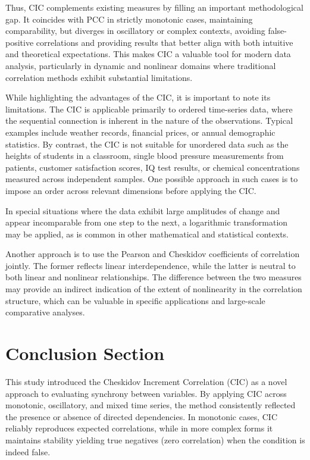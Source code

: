 \documentclass[aos]{imsart}
\newcommand{\cic}{\text{CIC}}
\newcommand{\pcc}{\text{PCC}}
\begin{document}
Thus, $\cic$ complements existing measures by filling an important methodological gap. It coincides with $\pcc$ in strictly monotonic cases, maintaining comparability, but diverges in oscillatory or complex contexts, avoiding false-positive correlations and providing results that better align with both intuitive and theoretical expectations. This makes $\cic$ a valuable tool for modern data analysis, particularly in dynamic and nonlinear domains where traditional correlation methods exhibit substantial limitations.

While highlighting the advantages of the $\cic$, it is important to note its limitations. The $\cic$ is applicable primarily to ordered time-series data, where the sequential connection is inherent in the nature of the observations. Typical examples include weather records, financial prices, or annual demographic statistics. By contrast, the $\cic$ is not suitable for unordered data such as the heights of students in a classroom, single blood pressure measurements from patients, customer satisfaction scores, IQ test results, or chemical concentrations measured across independent samples. One possible approach in such cases is to impose an order across relevant dimensions before applying the $\cic$.

In special situations where the data exhibit large amplitudes of change and appear incomparable from one step to the next, a logarithmic transformation may be applied, as is common in other mathematical and statistical contexts.

Another approach is to use the Pearson and Cheskidov coefficients of correlation jointly. The former reflects linear interdependence, while the latter is neutral to both linear and nonlinear relationships. The difference between the two measures may provide an indirect indication of the extent of nonlinearity in the correlation structure, which can be valuable in specific applications and large-scale comparative analyses.

\section{Conclusion Section}

This study introduced the Cheskidov Increment Correlation ($\cic$) as a novel approach to evaluating synchrony between variables. By applying $\cic$ across monotonic, oscillatory, and mixed time series, the method consistently reflected the presence or absence of directed dependencies. In monotonic cases, $\cic$ reliably reproduces expected correlations, while in more complex forms it maintains stability yielding true negatives (zero correlation) when the condition is indeed false.
\end{document}
